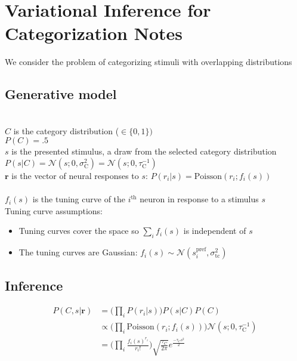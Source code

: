 \documentclass[12pt]{article}
\begin{document}
\section*{Variational Inference for Categorization Notes}
We consider the problem of categorizing stimuli with overlapping distributions
\subsection{Generative model}
 \\
$C$ is the category distribution ($\in \{0, 1\})$\\
$P(C) = .5$\\ 
$s$ is the presented stimulus, a draw from the selected category distribution\\
$P(s|C) = \mathcal{N} (s; 0, \sigma_{\text{C}}^2) = \mathcal{N} (s; 0, \tau_{\text{C}}^{-1})$\\
$\mathbf{r}$ is the vector of neural responses to $s$:
$P(r_i|s) = \text{Poisson}(r_i; f_i(s))$\\
~\\
$f_i(s)$ is the tuning curve of the $i^\text{th}$ neuron in response to a stimulus $s$\\
Tuning curve assumptions:
\begin{itemize}
\item Tuning curves cover the space so $\sum_i f_i(s)$ is independent of $s$
\item The tuning curves are Gaussian: $f_i(s) \sim \mathcal{N} (s_i^{\text{pref}}, \sigma_{\text{tc}}^2)$
\end{itemize}

\subsection{Inference}
\begin{equation}
\begin{aligned}
P(C, s|\mathbf{r}) &= \Big(\prod_i P(r_i|s)\Big) P(s|C) P(C)\\
&\propto \Big(\prod_i \text{Poisson}(r_i; f_i(s))\Big) \mathcal{N} (s; 0, \tau_{\text{C}}^{-1})\\
&= \Big(\prod_i \frac{f_i(s)^{r_i}}{r_i!} \Big) \sqrt{\frac{\tau_C}{2 \pi}} e^{\frac{-\tau_C s^2}{2}}
\end{aligned}
\end{equation}
\end{document}
